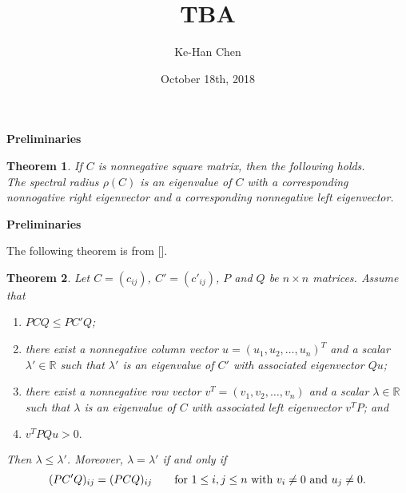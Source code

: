 \documentclass{beamer}
\theoremstyle{plain}
\newtheorem{thm}{Theorem}[section]
\theoremstyle{definition}
\begin{document}
\title[]{TBA}
\author[]{Ke-Han Chen\\} %
\date{October 18th, 2018}

\begin{frame}
\maketitle
\end{frame}

\begin{frame}{\bf Preliminaries}
    \begin{thm}
        If $C$ is nonnegative square matrix, then the following holds. \\
        The spectral radius $\rho(C)$ is an eigenvalue of $C$ with a corresponding nonnogative right eigenvector and a corresponding nonnegative left eigenvector.
    \end{thm}
\end{frame}

\begin{frame}{\bf Preliminaries}

The following theorem is from [].

\begin{thm}
 Let $C=(c_{ij})$, $C'=(c'_{ij})$, $P$ and $Q$ be  $n\times n$ matrices.
Assume that
\begin{enumerate}
\item[(i)]    $PCQ\leq PC'Q$;
\item[(ii)]  there exist a nonnegative column vector $u=(u_1, u_2, \ldots, u_n)^T$  and a scalar $\lambda'\in \mathbb{R}$ such that $\lambda'$ is an eigenvalue of $C'$ with associated eigenvector $Qu$;
\item[(iii)] there exist a nonnegative row vector $v^T=(v_1, v_2, \ldots, v_n)$  and a scalar $\lambda\in \mathbb{R}$
such that $\lambda$ is an eigenvalue of $C$ with associated  left eigenvector $v^TP$; and
\item[(iv)] $v^TPQu>0.$
\end{enumerate}
 Then $\lambda\leq \lambda'$.
    Moreover, $\lambda=\lambda'$ 
if and only if
    \begin{equation*}
        \label{e3}
(PC'Q)_{ij}=(PCQ)_{ij}\qquad \hbox{for~}1\leq i, j\leq n \hbox{~with~} v_i\ne 0 \hbox{~and~} u_j\ne 0.
\end{equation*}
\end{thm}
\end{frame}
\end{document}
